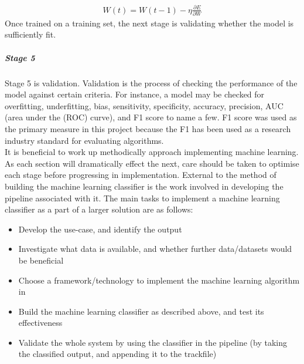 \documentclass{UoNMCHA}
\numberwithin{equation}{section}
\begin{document}
\begin{gather}\label{eq:BP_grad_dec}
    W(t) = W(t-1) - \eta\frac{\partial E}{\partial W} 
\end{gather}
Once trained on a training set, the next stage is validating whether the model is sufficiently fit.

\subparagraph{Stage 5}
Stage 5 is validation. Validation is the process of checking the performance of the model against certain criteria. For instance, a model may be checked for overfitting, underfitting, bias, sensitivity, specificity, accuracy, precision, AUC (area under the (ROC) curve), and F1 score to name a few. F1 score was used as the primary measure in this project because the F1 has been used as a research industry standard for evaluating algorithms. \\

It is beneficial to work up methodically approach implementing machine learning. As each section will dramatically effect the next, care should be taken to optimise each stage before progressing in implementation. External to the method of building the machine learning classifier is the work involved in developing the pipeline associated with it. The main tasks to implement a machine learning classifier as a part of a larger solution are as follows:

\begin{itemize}
    \item Develop the use-case, and identify the output
    \item Investigate what data is available, and whether further data/datasets would be beneficial
    \item Choose a framework/technology to implement the machine learning algorithm in
    \item Build the machine learning classifier as described above, and test its effectiveness
    \item Validate the whole system by using the classifier in the pipeline (by taking the classified output, and appending it to the trackfile)
\end{itemize}
\end{document}

